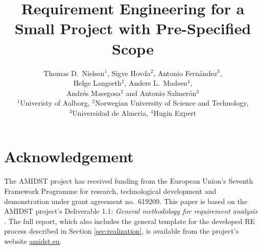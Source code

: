 \documentclass[ukenglish]{nik}
\title{Requirement Engineering for a Small Project with Pre-Specified Scope}
\author{Thomas D.\ Nielsen$^{1}$, Sigve Hovda$^{2}$, Antonio Fern\'andez$^{3}$, \\ Helge Langseth$^{2}$, 
Anders L.\ Madsen$^{4}$, \\Andr\'es Masegosa$^{2}$ and  Antonio Salmer\'on$^{3}$ \\
\normalsize $^{1}$Univeristy of Aalborg, $^{2}$Norwegian University of Science and Technology, 
\\
\normalsize $^{3}$Universidad de Almeria, $^{4}$Hugin Expert}
\begin{document}
\maketitle

\begin{abstract}

\end{abstract}




 






\section*{Acknowledgement}
The AMIDST project has received funding from the European Union's Seventh
Framework Programme for research, technological development and
demonstration under grant agreement no.\ 619209.
This paper is based on the AMIDST project's Deliverable 1.1:  \emph{General methodology for
  requirement analysis}  \cite{Fer14}. The full report, which also includes the general template for the developed RE process described in Section \ref{sec:realization},
 is available from the project's website \url{amidst.eu}.



\end{document}
